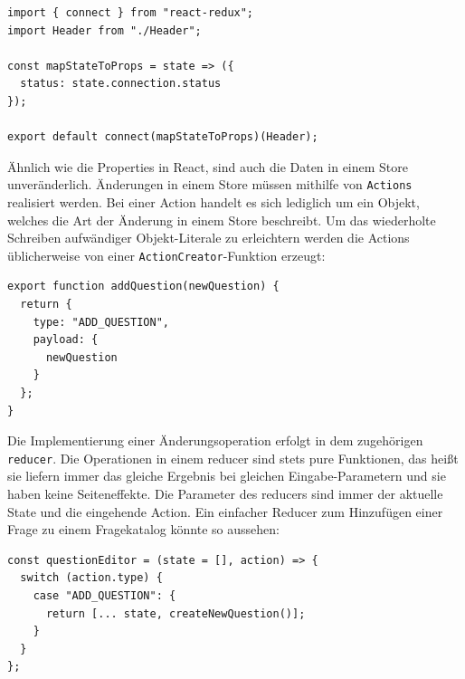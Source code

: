 \begin{minipage}{\linewidth}
\begin{lstlisting}[caption={Über den connect-Aufruf beim Exportieren der Komponente wird sie mit dem Store verbunden.}]
import { connect } from "react-redux";
import Header from "./Header";

const mapStateToProps = state => ({
  status: state.connection.status
});

export default connect(mapStateToProps)(Header);
\end{lstlisting}
\end{minipage}

Ähnlich wie die Properties in React, sind auch die Daten in einem Store unveränderlich. Änderungen in einem Store müssen mithilfe von \texttt{Actions} realisiert werden. Bei einer Action handelt es sich lediglich um ein Objekt, welches die Art der Änderung in einem Store beschreibt. Um das wiederholte Schreiben aufwändiger Objekt-Literale zu erleichtern werden die Actions üblicherweise von einer \texttt{ActionCreator}-Funktion erzeugt:

\begin{minipage}{\linewidth}
\begin{lstlisting}[caption={Ein Action-Objekt ist lediglich die Beschreibung einer Änderungsoperation und wird in einem ActionCreator erzeugt.}]
export function addQuestion(newQuestion) {
  return {
    type: "ADD_QUESTION",
    payload: {
      newQuestion
    }
  };
}
\end{lstlisting}
\end{minipage}

Die Implementierung einer Änderungsoperation erfolgt in dem zugehörigen \texttt{reducer}. Die Operationen in einem reducer sind stets pure Funktionen, das heißt sie liefern immer das gleiche Ergebnis bei gleichen Eingabe-Parametern und sie haben keine Seiteneffekte. Die Parameter des reducers sind immer der aktuelle State und die eingehende Action. Ein einfacher Reducer zum Hinzufügen einer Frage zu einem Fragekatalog könnte so aussehen:

\begin{minipage}{\linewidth}
\begin{lstlisting}[caption={In einem Reducer werden die Änderungsoperationen eines Stores als pure Funktion implementiert.}]
const questionEditor = (state = [], action) => {
  switch (action.type) {
    case "ADD_QUESTION": {
      return [... state, createNewQuestion()];
    }
  }
};
\end{lstlisting}
\end{minipage}

